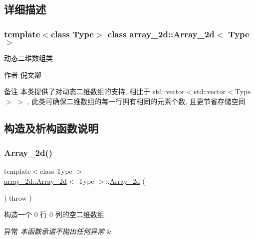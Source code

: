 \subsection{详细描述}
\subsubsection*{template$<$class Type$>$\newline
class array\+\_\+2d\+::\+Array\+\_\+2d$<$ Type $>$}

动态二维数组类 

\begin{DoxyAuthor}{作者}
倪文卿 
\end{DoxyAuthor}
\begin{DoxyRemark}{备注}
本类提供了对动态二维数组的支持, 相比于 std\+::vector$<$std\+::vector$<$\+Type$>$ $>$ , 此类可确保二维数组的每一行拥有相同的元素个数, 且更节省存储空间 
\end{DoxyRemark}


\subsection{构造及析构函数说明}
\mbox{\label{classarray__2d_1_1_array__2d_a46091ff0390e83377efa1d2b9e9870d5}} 
\subsubsection{\texorpdfstring{Array\+\_\+2d()}{Array\_2d()}\hspace{0.1cm}{\footnotesize\ttfamily [1/4]}}
{\footnotesize\ttfamily template$<$class Type $>$ \\
\hyperlink{classarray__2d_1_1_array__2d}{array\+\_\+2d\+::\+Array\+\_\+2d}$<$ Type $>$\+::\hyperlink{classarray__2d_1_1_array__2d}{Array\+\_\+2d} (\begin{DoxyParamCaption}{ }\end{DoxyParamCaption}) throw  ) }



构造一个 0 行 0 列的空二维数组 


\begin{DoxyExceptions}{异常}
{\em 本函数承诺不抛出任何异常} & \\
\hline
\end{DoxyExceptions}
\mbox{\label{classarray__2d_1_1_array__2d_ae1230f7ac7f0558df988369c47ef78ba}} 
